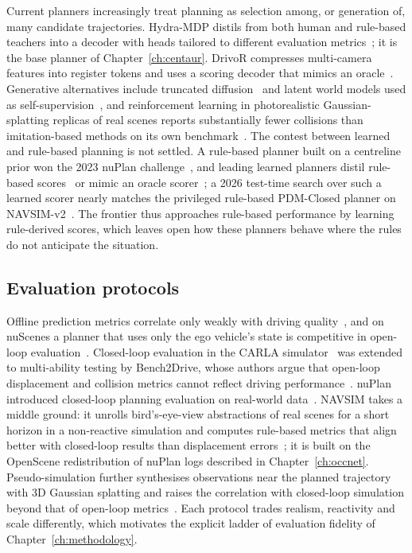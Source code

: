 Current planners increasingly treat planning as selection among, or generation of, many candidate trajectories. Hydra-MDP distils from both human and rule-based teachers into a decoder with heads tailored to different evaluation metrics~\cite{li2024hydramdp}; it is the base planner of Chapter~\ref{ch:centaur}. DrivoR compresses multi-camera features into register tokens and uses a scoring decoder that mimics an oracle~\cite{kirby2026drivor}. Generative alternatives include truncated diffusion~\cite{liao2025diffusiondrive} and latent world models used as self-supervision~\cite{li2025law}, and reinforcement learning in photorealistic Gaussian-splatting replicas of real scenes reports substantially fewer collisions than imitation-based methods on its own benchmark~\cite{gao2025rad}. The contest between learned and rule-based planning is not settled. A rule-based planner built on a centreline prior won the 2023 nuPlan challenge~\cite{dauner2023parting}, and leading learned planners distil rule-based scores~\cite{li2024hydramdp} or mimic an oracle scorer~\cite{kirby2026drivor}; a 2026 test-time search over such a learned scorer nearly matches the privileged rule-based PDM-Closed planner on NAVSIM-v2~\cite{xu2026toad}. The frontier thus approaches rule-based performance by learning rule-derived scores, which leaves open how these planners behave where the rules do not anticipate the situation.

\subsection{Evaluation protocols}

Offline prediction metrics correlate only weakly with driving quality~\cite{codevilla2018offline}, and on nuScenes a planner that uses only the ego vehicle's state is competitive in open-loop evaluation~\cite{zhai2023rethinking,li2024ego}. Closed-loop evaluation in the CARLA simulator~\cite{dosovitskiy2017carla} was extended to multi-ability testing by Bench2Drive, whose authors argue that open-loop displacement and collision metrics cannot reflect driving performance~\cite{jia2024bench2drive}. nuPlan introduced closed-loop planning evaluation on real-world data~\cite{karnchanachari2024nuplan}. NAVSIM takes a middle ground: it unrolls bird's-eye-view abstractions of real scenes for a short horizon in a non-reactive simulation and computes rule-based metrics that align better with closed-loop results than displacement errors~\cite{dauner2024navsim}; it is built on the OpenScene redistribution of nuPlan logs described in Chapter~\ref{ch:occnet}. Pseudo-simulation further synthesises observations near the planned trajectory with 3D Gaussian splatting and raises the correlation with closed-loop simulation beyond that of open-loop metrics~\cite{cao2025pseudo}. Each protocol trades realism, reactivity and scale differently, which motivates the explicit ladder of evaluation fidelity of Chapter~\ref{ch:methodology}.

